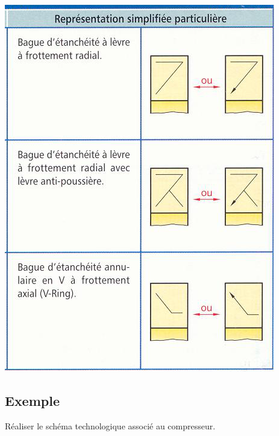 \documentclass[10pt,oneside]{article}
\begin{document}
\begin{minipage}[c]{.45\linewidth}
\begin{center}
\includegraphics[width=.95\textwidth]{png/joint_3}
\end{center}
\end{minipage}

\subsection{Exemple}

\begin{exemple}
Réaliser le schéma technologique associé au compresseur.
\end{exemple}
\end{document}
